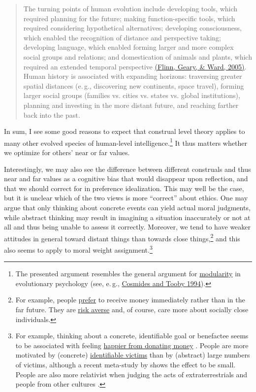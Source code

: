 \begin{quote}
The turning points of human evolution include developing tools, which
required planning for the future; making function-specific tools, which
required considering hypothetical alternatives; developing
consciousness, which enabled the recognition of distance and perspective
taking; developing language, which enabled forming larger and more
complex social groups and relations; and domestication of animals and
plants, which required an extended temporal perspective
\href{http://web.missouri.edu/~gearyd/Flinnetal2005.pdf}{(Flinn,
Geary, \& Ward, 2005)}. Human history is associated with expanding
horizons: traversing greater spatial distances (e.\,g., discovering new
continents, space travel), forming larger social groups (families vs.
cities vs. states vs. global institutions), planning and investing in
the more distant future, and reaching farther back into the past.
\end{quote}

In sum, I see some good reasons to expect that construal level theory
applies to many other evolved species of human-level
intelligence.\footnote{The presented argument resembles the general
  argument for
  \href{https://en.wikipedia.org/wiki/Modularity_of_mind}{modularity}
  in evolutionary psychology (see, e.\,g.,
  \href{http://citeseerx.ist.psu.edu/viewdoc/download?doi=10.1.1.140.7758\&rep=rep1\&type=pdf}{Cosmides
  and Tooby 1994}).} It thus matters whether we optimize for others'
near or far values.

Interestingly, we may also see the difference between different
construals and thus near and far values as a cognitive bias that would
disappear upon reflection, and that we should correct for in preference
idealization. This may well be the case, but it is unclear which of the
two views is more ``correct'' about ethics. One may argue that only
thinking about concrete events can yield actual moral judgments, while
abstract thinking may result in imagining a situation inaccurately or
not at all and thus being unable to assess it correctly. Moreover, we
tend to have weaker attitudes in general toward distant things than
towards close things,\footnote{For example, people
  \href{https://en.wikipedia.org/wiki/Time_preference}{prefer} to
  receive money immediately rather than in the far future. They are
  \href{https://en.wikipedia.org/wiki/Risk_aversion}{risk averse}
  and, of course, care more about socially close individuals.}
and this also seems to apply to moral weight assignment.\footnote{For
  example, thinking about a concrete, identifiable goal or benefactee
  seems to be associated with feeling
  \href{https://en.wikipedia.org/wiki/Warm-glow_giving}{happier
  from donating money} \parencite{Rudd2014-getting}. People are more motivated by (concrete)
  \href{https://en.wikipedia.org/wiki/Identifiable_victim_effect}{identifiable
  victims} than by (abstract) large numbers of victims, although a
  recent meta-study by \citet{Lee2016-lb} shows the
  effect to be small. People are
  also more relativist when judging the acts of extraterrestrials and
  people from other cultures \parencite{Sarkissian2011-be}.}

